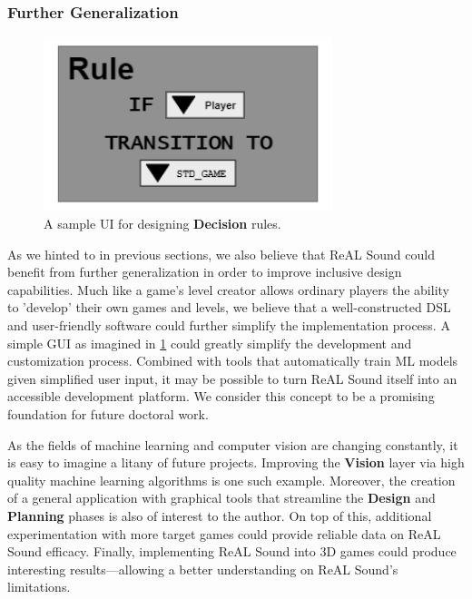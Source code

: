\documentclass{report}
\newcommand{\rs}{ReAL Sound\xspace}
\newcommand{\plan}{\textbf{Planning}\xspace}
\newcommand{\design}{\textbf{Design}\xspace}
\newcommand{\vision}{\textbf{Vision}\xspace}
\newcommand{\decision}{\textbf{Decision}\xspace}
\begin{document}
\subsubsection{Further Generalization}

\begin{figure}

    \centering
    \includegraphics[width=0.75\textwidth]{ruleEX.png}

    \caption{A sample UI for designing \decision rules.}
    \label{fig:ruleEX}
\end{figure}

As we hinted to in previous sections, we also believe that \rs could benefit from further generalization in order to improve inclusive design capabilities. Much like a game's level creator allows ordinary players the ability to 'develop' their own games and levels, we believe that a well-constructed DSL and user-friendly software could further simplify the implementation process. A simple GUI as imagined in \cref{fig:ruleEX} could greatly simplify the development and customization process. Combined with tools that automatically train ML models given simplified user input, it may be possible to turn \rs itself into an accessible development platform. We consider this concept to be a promising foundation for future doctoral work.  

As the fields of machine learning and computer vision are changing constantly, it is easy to imagine a litany of future projects. Improving the \vision layer via high quality machine learning algorithms is one such example. Moreover, the creation of a general application with graphical tools that streamline the \design and \plan phases is also of interest to the author. On top of this, additional experimentation with more target games could provide reliable data on \rs efficacy. Finally, implementing \rs into 3D games could produce interesting results---allowing a better understanding on \rs's limitations.
\end{document}
